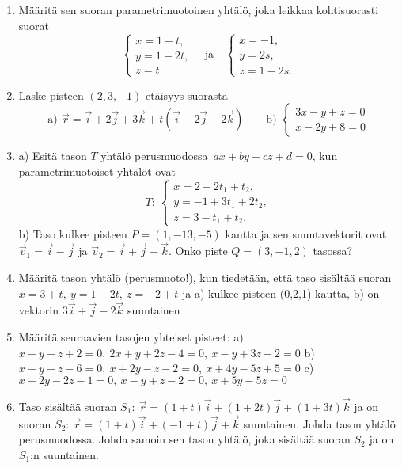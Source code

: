 \begin{enumerate}
\item
Määritä sen suoran parametrimuotoinen yhtälö, joka leikkaa kohtisuorasti suorat
\[
\begin{cases} x=1+t, \\ y=1-2t, \\ z=t \end{cases} \quad \text{ja} \quad
\begin{cases} x=-1, \\ y=2s, \\ z=1-2s. \end{cases}
\]

\item
Laske pisteen $(2,3,-1)$ etäisyys suorasta
\[
\text{a)}\,\ \vec r=\vec i+2\vec j+3\vec k+t(\vec i-2\vec j+2\vec k) \qquad
\text{b)}\,\ \begin{cases} 3x-y+z=0\\x-2y+8=0 \end{cases}
\]

\item
a) Esitä tason $T$ yhtälö perusmuodossa $\,ax+by+cz+d=0$, kun parametrimuotoiset
yhtälöt ovat
\[ 
T:\ \begin{cases}
     x=2+2t_1+t_2, \\ y=-1+3t_1+2t_2, \\ z=3-t_1+t_2.
     \end{cases}
\]
b) Taso kulkee pisteen $P=(1,-13,-5)$ kautta ja sen suuntavektorit ovat
$\vec v_1=\vec i-\vec j$ ja $\vec v_2=\vec i+\vec j+\vec k$. Onko piste $Q=(3,-1,2)$
tasossa?

\item
Määritä tason yhtälö (perusmuoto!), kun tiedetään, että taso sisältää suoran
$x=3+t,\ y=1-2t,\ z=-2+t$ ja a) kulkee pisteen (0,2,1) kautta, b) on vektorin
$3\vec i+\vec j-2\vec k$ suuntainen

\item
Määritä seuraavien tasojen yhteiset pisteet: \newline
a) \ $x+y-z+2=0,\ 2x+y+2z-4=0,\ x-y+3z-2=0$ \newline
b) \ $x+y+z-6=0,\ x+2y-z-2=0,\  x+4y-5z+5=0$ \newline
c) \ $x+2y-2z-1=0,\ x-y+z-2=0,\ x+5y-5z=0$

\item Taso sisältää suoran $S_1:\ \vec r=(1+t)\vec i+(1+2t)\vec j+(1+3t)\vec k$ ja on suoran
$S_2:\ \vec r=(1+t)\vec i+(-1+t)\vec j+\vec k$ suuntainen. Johda tason yhtälö perusmuodossa.
Johda samoin sen tason yhtälö, joka sisältää suoran $S_2$ ja on $S_1$:n suuntainen.


\end{enumerate}
